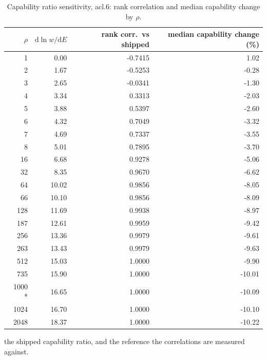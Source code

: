 \begin{table}[htbp]
  \centering
  \caption{Capability ratio sensitivity, acl.6: rank correlation and median capability change by $\rho$.}
  \label{tab:rho-acl-6-summary}
  \begin{tabular}{r r r r}
    \toprule
    $\rho$ & $\mathrm{d}\ln w/\mathrm{d}E$ & rank corr.\ vs shipped & median capability change (\%) \\
    \midrule
    1 & 0.00 & -0.7415 & 1.02 \\
    2 & 1.67 & -0.5253 & -0.28 \\
    3 & 2.65 & -0.0341 & -1.30 \\
    4 & 3.34 & 0.3313 & -2.03 \\
    5 & 3.88 & 0.5397 & -2.60 \\
    6 & 4.32 & 0.7049 & -3.32 \\
    7 & 4.69 & 0.7337 & -3.55 \\
    8 & 5.01 & 0.7895 & -3.70 \\
    16 & 6.68 & 0.9278 & -5.06 \\
    32 & 8.35 & 0.9670 & -6.62 \\
    64 & 10.02 & 0.9856 & -8.05 \\
    66 & 10.10 & 0.9856 & -8.09 \\
    128 & 11.69 & 0.9938 & -8.97 \\
    187 & 12.61 & 0.9959 & -9.42 \\
    256 & 13.36 & 0.9979 & -9.61 \\
    263 & 13.43 & 0.9979 & -9.63 \\
    512 & 15.03 & 1.0000 & -9.90 \\
    735 & 15.90 & 1.0000 & -10.01 \\
    1000 * & 16.65 & 1.0000 & -10.09 \\
    1024 & 16.70 & 1.0000 & -10.10 \\
    2048 & 18.37 & 1.0000 & -10.22 \\
    \bottomrule
  \end{tabular}
  \par\smallskip\footnotesize * the shipped capability ratio, and the reference the correlations are measured against.
\end{table}
